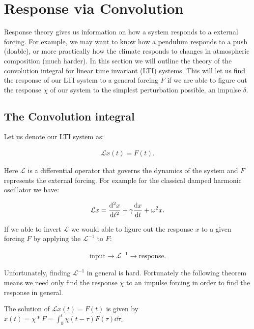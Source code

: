 
\section{Response via Convolution}

Response theory gives us information on how a system responds to a external forcing. For example, we may want to know how a pendulum responds to a push (doable), or more practically how the climate responds to changes in atmospheric composition (much harder). In this section we will outline the theory of the convolution integral for linear time invariant (LTI) systems. This will let us find the response of our LTI system to a general forcing $F$ if we are able to figure out the response $\chi$ of our system to the simplest perturbation possible, an impulse $\delta$.

\subsection*{The Convolution integral}

Let us denote our LTI system as:

\begin{align}
\mathcal{L}x(t) = F(t).
\end{align}

Here $\mathcal{L}$ is a differential operator that governs the dynamics of the system and $F$ represents the external forcing. For example for the classical damped harmonic oscillator we have:

\begin{align*}
\mathcal{L} x = \dv[2]{x}{t} + \gamma \dv{x}{t} + \omega ^2 x.
\end{align*} 

If we able to invert $\mathcal{L}$ we would able to figure out the response $x$ to a given forcing $F$ by applying the $\mathcal{L}^{-1}$ to $F$:

\begin{align*}
\text{input} \to \mathcal{L}^{-1} \to \text{response}.
\end{align*}

Unfortunately, finding $\mathcal{L}^{-1}$ in general is hard. Fortunately the following theorem means we need only find the response $\chi$ to an impulse forcing in order to find the response in general.

\begin{thm}
The solution of $\mathcal{L}x(t) = F(t)$ is given by $x(t) = \chi * F = \int_0^t \chi(t - \tau) F(\tau) \dd \tau$.
\end{thm}


